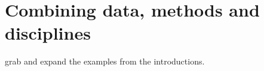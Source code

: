 

\section{Combining data, methods and disciplines}

grab and expand the examples from the introductions.

